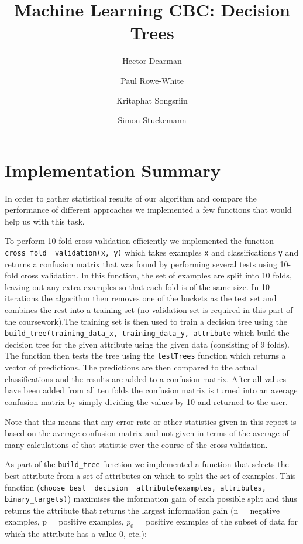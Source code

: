 \documentclass[11pt,a4paper]{article}
\author{Hector Dearman \and Paul Rowe-White \and Kritaphat Songsriin \and Simon Stuckemann}
\title{Machine Learning CBC: Decision Trees}
\begin{document}
\maketitle

\section{Implementation Summary}

In order to gather statistical results of our algorithm and compare the performance of different approaches we implemented a few functions that would help us with this task.

To perform 10-fold cross validation efficiently we implemented the function \texttt{cross\_fold \_validation(x, y)} which takes examples \texttt{x} and classifications \texttt{y} and returns a confusion matrix that was found by performing several tests using 10-fold cross validation. In this function, the set of examples are split into 10 folds, leaving out any extra examples so that each fold is of the same size. In 10 iterations the algorithm then removes one of the buckets as the test set and combines the rest into a training set (no validation set is required in this part of the coursework).The training set is then used to train a decision tree using the \texttt{build\_tree(training\_data\_x, training\_data\_y, attribute} which build the decision tree for the given attribute using the given data (consisting of 9 folds). The function then tests the tree using the \texttt{testTrees} function which returns a vector of predictions. The predictions are then compared to the actual classifications and the results are added to a confusion matrix. After all values have been added from all ten folds the confusion matrix is turned into an average confusion matrix by simply dividing the values by 10 and returned to the user. 

Note that this means that any error rate or other statistics given in this report is based on the average confusion matrix and not given in terms of the average of many calculations of that statistic over the course of the cross validation. 

As part of the \texttt{build\_tree} function we implemented a function that selects the best attribute from a set of attributes on which to split the set of examples. This function (\texttt{choose\_best \_decision \_attribute(examples, attributes, binary\_targets)}) maximises the information gain of each possible split and thus returns the attribute that returns the largest information gain (n = negative examples, p = positive examples, $p_0$ = positive examples of the subset of data for which the attribute has a value 0, etc.):
\end{document}
